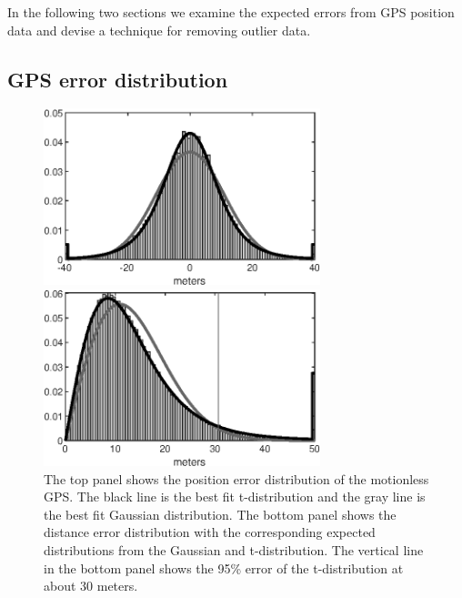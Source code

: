 \documentclass[10pt,journal]{IEEEtran}
\begin{document}
In the following two sections we examine the expected errors from GPS position data and devise a technique for removing outlier data.

%
\subsection{GPS error distribution}
\label{gps_position_errors}
%

\begin{figure}
  \centerline{\includegraphics[width=19pc,angle=0]{figures/gps_error_distribution}}
  \centerline{\includegraphics[width=19pc,angle=0]{figures/gps_distance_error_distribution}} 
  \caption{The top panel shows the position error distribution of the motionless GPS. The black line is the best fit t-distribution and the gray line is the best fit Gaussian distribution. The bottom panel shows the distance error distribution with the corresponding expected distributions from the Gaussian and t-distribution. The vertical line in the bottom panel shows the 95\% error of the t-distribution at about 30 meters.}
  \label{motionless_error}
\end{figure}
\end{document}
